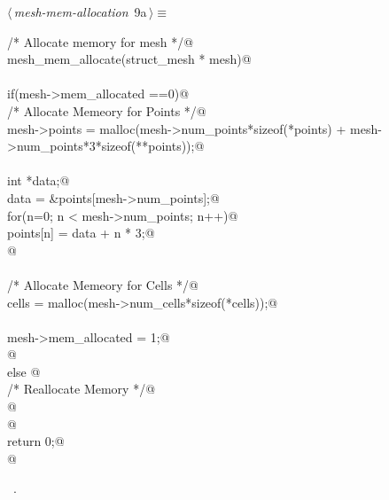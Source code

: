 \documentclass[a4paper,11pt]{article}
\begin{document}
\begin{flushleft} \small
\begin{minipage}{\linewidth}\label{scrap7}\raggedright\small
{} $\langle\,${\itshape mesh-mem-allocation}\nobreak\ {\footnotesize {9a}}$\,\rangle\equiv$
\vspace{-1ex}
\begin{list}{}{} \item
\mbox{}\verb@/* Allocate memory for mesh */@\\
\mbox{}\verb@int mesh_mem_allocate(struct_mesh * mesh){@\\
\mbox{}\verb@@\\
\mbox{}\verb@    if(mesh->mem_allocated ==0){@\\
\mbox{}\verb@        /* Allocate Memeory for Points */@\\
\mbox{}\verb@        mesh->points = malloc(mesh->num_points*sizeof(*points) + mesh->num_points*3*sizeof(**points));@\\
\mbox{}\verb@@\\
\mbox{}\verb@        int *data;@\\
\mbox{}\verb@        data = &points[mesh->num_points];@\\
\mbox{}\verb@        for(n=0; n < mesh->num_points; n++){@\\
\mbox{}\verb@            points[n] = data + n * 3;@\\
\mbox{}\verb@        }@\\
\mbox{}\verb@@\\
\mbox{}\verb@        /* Allocate Memeory for Cells */@\\
\mbox{}\verb@        cells = malloc(mesh->num_cells*sizeof(*cells));@\\
\mbox{}\verb@@\\
\mbox{}\verb@        mesh->mem_allocated = 1;@\\
\mbox{}\verb@    }@\\
\mbox{}\verb@    else {@\\
\mbox{}\verb@        /* Reallocate Memory */@\\
\mbox{}\verb@    }@\\
\mbox{}\verb@   @\\
\mbox{}\verb@   return 0;@\\
\mbox{}\verb@}@\\
\mbox{}\verb@@{\NWsep}
\end{list}
\vspace{-1.5ex}
\footnotesize
\begin{list}{}{\setlength{\itemsep}{-\parsep}\setlength{\itemindent}{-\leftmargin}}
\item \NWtxtMacroRefIn\ .

\item{}
\end{list}
\end{minipage}\vspace{4ex}
\end{flushleft}
\end{document}
